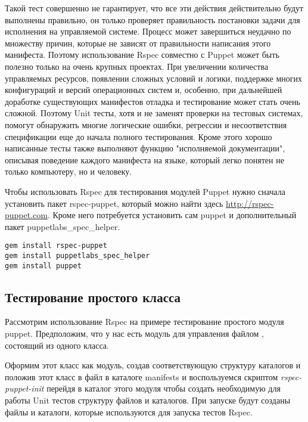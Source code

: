 Такой тест совершенно не гарантирует, что все эти действия действительно будут выполнены правильно, он только проверяет правильность постановки задачи для исполнения на управляемой системе. Процесс может завершиться неудачно по множеству причин, которые не зависят от правильности написания этого манифеста. Поэтому использование Rspec совместно с Puppet может быть полезно только на очень крупных проектах. При увеличении количества управляемых ресурсов, появлении сложных условий и логики, поддержке многих конфигураций и версий операционных систем и, особенно, при дальнейшей доработке существующих манифестов отладка и тестирование может стать очень сложной. Поэтому Unit тесты, хотя и не заменят проверки на тестовых системах, помогут обнаружить многие логические ошибки, регрессии и несоответствия спецификации еще до начала полного тестирования. Кроме этого хорошо написанные тесты также выполняют функцию "исполняемой документации", описывая поведение каждого манифеста на языке, который легко понятен не только компьютеру, но и человеку.

Чтобы использовать Rspec для тестирования модулей Puppet нужно сначала установить пакет rspec-puppet, который можно найти здесь \url{http://rspec-puppet.com}. Кроме него потребуется установить сам puppet и дополнительный пакет puppetlabs\_spec\_helper.

\begin{verbatim}
gem install rspec-puppet
gem install puppetlabs_spec_helper
gem install puppet
\end{verbatim}

\subsection{Тестирование простого класса}

Рассмотрим использование Rspec на примере тестирование простого модуля puppet. Предположим, что у нас есть модуль для управления файлом , состоящий из одного класса.



Оформим этот класс как модуль, создав соответствующую структуру каталогов и положив этот класс в файл  в каталоге manifests и воспользуемся скриптом \emph{rspec-puppet-init} перейдя в каталог этого модуля чтобы создать необходимую для работы Unit тестов структуру файлов и каталогов. При запуске будут созданы файлы и каталоги, которые используются для запуска тестов Rspec.

